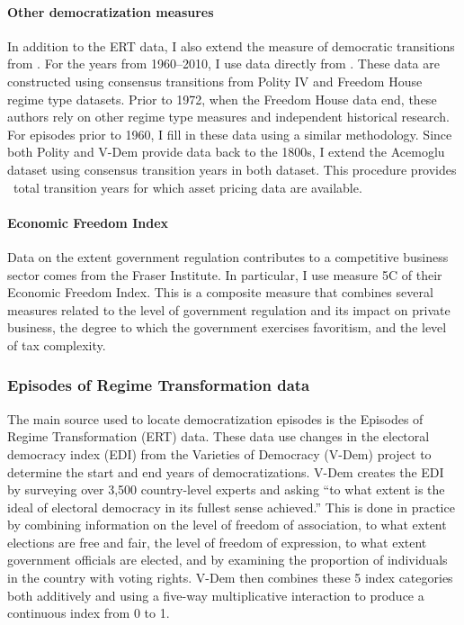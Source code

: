 \documentclass[12pt]{article}
\numberwithin{equation}{section}
\begin{document}
\paragraph{Other democratization measures}
In addition to the ERT data, I also extend the measure of democratic transitions from \cite{Acemoglu2019}. For the years from 1960--2010, I use data directly from \citeauthor{Acemoglu2019}. These data are constructed using consensus transitions from Polity IV and Freedom House regime type datasets. Prior to 1972, when the Freedom House data end, these authors rely on other regime type measures and independent historical research. For episodes prior to 1960, I fill in these data using a similar methodology.   Since both Polity and V-Dem provide data back to the 1800s, I extend the Acemoglu dataset using consensus transition years in both dataset. This procedure provides \tabBThreeAceDem\ total transition years for which asset pricing data are available. 

\paragraph{Economic Freedom Index}
Data on the extent government regulation contributes to a competitive business sector comes from the Fraser Institute. In particular, I use measure 5C of their Economic Freedom Index. This is a composite measure that combines several measures related to the level of government regulation and its impact on private business, the degree to which the government exercises favoritism, and the level of tax complexity.

\subsubsection{Episodes of Regime Transformation data}\label{section:ERTdescription}

The main source used to locate democratization episodes is the Episodes of Regime Transformation (ERT) data. These data use changes in the electoral democracy index (EDI) from the Varieties of Democracy (V-Dem) project to determine the start and end years of democratizations.  V-Dem creates the EDI by surveying over 3,500 country-level experts and asking  ``to what extent is the ideal of electoral democracy in its fullest sense achieved.'' This is done in practice by combining information on the level of freedom of association, to what extent elections are free and fair, the level of freedom of expression, to what extent government officials are elected, and by examining the proportion of individuals in the country with voting rights. V-Dem then combines these 5 index categories both additively and using a five-way multiplicative interaction to produce a continuous index from 0 to 1.
\end{document}
